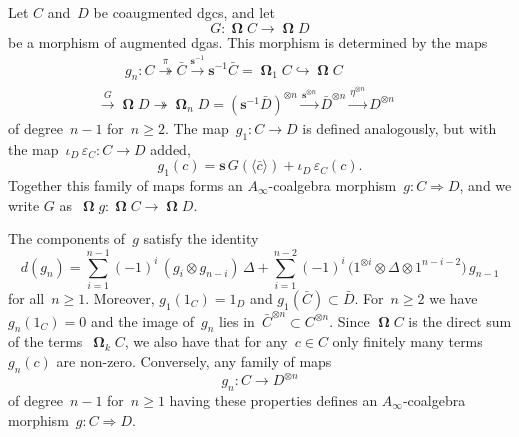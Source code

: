 \documentclass[letterpaper]{amsart}
\numberwithin{equation}{section}
\theoremstyle{plain}
\theoremstyle{definition}
\theoremstyle{remark}
\let\epsilon\varepsilon
\def\Ainf{A_{\infty}}
\def\susp{\mathbf{s}}
\def\desusp{\susp^{-1}}
\DeclareMathOperator{\Cobar}{\mathbf{\Omega}}
\def\CobarEl#1{\langle#1\rangle}
\begin{document}
Let $C$ and~$D$ be coaugmented dgcs, and let
\begin{equation}
  G\colon \Cobar C \to \Cobar D
\end{equation}
be a morphism of augmented dgas.
This morphism is determined by the maps
\begin{multline}
  \qquad
  g_{n}\colon C \stackrel{\pi}{\twoheadrightarrow} \bar C \xrightarrow{\desusp} \desusp \bar C = \Cobar_{1}C \hookrightarrow \Cobar C \\
  \xrightarrow{G} \Cobar D \twoheadrightarrow \Cobar_{n} D = (\desusp \bar D)^{\otimes n} \xrightarrow{\susp^{\otimes n}} \bar D^{\otimes n} \xrightarrow{\eta^{\otimes n}} D^{\otimes n}
  \qquad
\end{multline}
of degree~$n-1$ for~$n\ge2$. The map~$g_{1}\colon C\to D$ is defined analogously, but with the map~$\iota_{D}\,\epsilon_{C}\colon C\to D$ added,
\begin{equation}
  g_{1}(c) = \susp\, G(\CobarEl{\bar c}) + \iota_{D}\,\epsilon_{C}(c).
\end{equation}
Together this family of maps forms an $\Ainf$-coalgebra morphism~$g\colon C\Rightarrow D$, and we write $G$ as~$\Cobar g\colon \Cobar C\to\Cobar D$.

The components of~$g$ satisfy the identity
\begin{equation}
  d(g_{n}) = \sum_{i=1}^{n-1}(-1)^{i}\,(g_{i}\otimes g_{n-i})\,\Delta
  +\sum_{i=1}^{n-2}(-1)^{i}\,\bigl(1^{\otimes i}\otimes\Delta\otimes 1^{n-i-2}\bigr)\,g_{n-1}
\end{equation}
for all~$n\ge1$. Moreover, $g_{1}(1_{C})=1_{D}$ and $g_{1}(\bar C)\subset\bar D$.
For~$n\ge2$ we have $g_{n}(1_{C})=0$ and the image of~$g_{n}$ lies in~$\bar C^{\otimes n}\subset C^{\otimes n}$.
Since $\Cobar C$ is the direct sum of the terms~$\Cobar_{k}C$, we also have that for any~$c\in C$ only finitely many terms~$g_{n}(c)$ are non-zero.
Conversely, any family of maps
\begin{equation}
  g_{n}\colon C\to D^{\otimes n}
\end{equation}
of degree~$n-1$ for~$n\ge1$ having these properties defines an $\Ainf$-coalgebra morphism~$g\colon C\Rightarrow D$.
\end{document}
